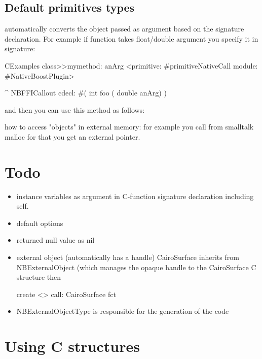 \documentclass[a4paper,10pt,twoside]{book}
\begin{document}
\subsection{Default primitives types}

\Spock automatically converts the object passed as argument based on the signature declaration. 
For example if function takes float/double argument you specify it in signature:

\begin{code}{}
CExamples class>>mymethod: anArg
	<primitive: #primitiveNativeCall module: #NativeBoostPlugin>
	
	^ NBFFICallout cdecl: #( int foo ( double anArg) )
\end{code}

and then you can use this method as follows: 




how to access "objects" in external memory: for example you call from smalltalk malloc for that you get an external pointer.





\section{Todo}

\begin{itemize}
\item instance variables as argument in C-function signature declaration including self.
\item default options
\item returned null value as nil
\item external object (automatically has a handle)
CairoSurface inherits from NBExternalObject (which manages the opaque handle to the CairoSurface C structure then 

\begin{code}{}
create  
	<>
	call: CairoSurface	fct 
\end{code}	


\item	
	NBExternalObjectType is responsible for the generation of the code
	
\end{itemize}


\section{Using C structures}
\end{document}
